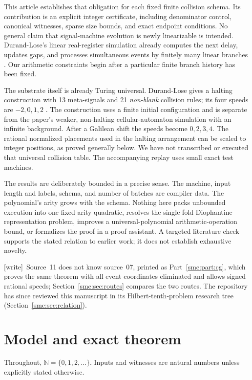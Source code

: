 \documentclass[11pt,letterpaper]{article}
\numberwithin{equation}{section}
\theoremstyle{definition}
\theoremstyle{remark}
\newcommand{\NN}{\mathbb N}
\newcommand{\wtag}{\textup{[write]}}
\begin{document}
This article establishes that obligation for each fixed finite collision schema. Its contribution is an explicit integer certificate, including denominator control, canonical witnesses, sparse size bounds, and exact endpoint conditions. No general claim that signal-machine evolution is newly linearizable is intended. Durand-Lose's linear real-register simulation already computes the next delay, updates gaps, and processes simultaneous events by finitely many linear branches \cite[Section~4]{DL07}. Our arithmetic constraints begin after a particular finite branch history has been fixed.

The substrate itself is already Turing universal. Durand-Lose gives a halting construction with 13 meta-signals and 21 \emph{non-blank} collision rules; its four speeds are $-2,0,1,2$ \cite[Theorem~5 and Figure~4]{durandlose}. The construction uses a finite initial configuration and is separate from the paper's weaker, non-halting cellular-automaton simulation with an infinite background. After a Galilean shift the speeds become $0,2,3,4$. The rational normalized placements used in the halting arrangement can be scaled to integer positions, as proved generally below. We have not transcribed or executed that universal collision table. The accompanying replay uses small exact test machines.

The results are deliberately bounded in a precise sense. The machine, input length and labels, schema, and number of batches are compiler data. The polynomial's arity grows with the schema. Nothing here packs unbounded execution into one fixed-arity quadratic, resolves the single-fold Diophantine representation problem, improves a universal-polynomial arithmetic-operation bound, or formalizes the proof in a proof assistant. A targeted literature check supports the stated relation to earlier work; it does not establish exhaustive novelty.


\wtag\ Source~11 does not know source~07, printed as Part~\ref{smc:part:cg}, which proves the same theorem with all event coordinates eliminated and allows signed rational speeds; Section~\ref{smc:sec:routes} compares the two routes. The repository has since reviewed this manuscript in its Hilbert-tenth-problem research tree (Section~\ref{smc:sec:relation}).

\section{Model and exact theorem}\label{smc:sd:sec:model}
Throughout, $\NN=\{0,1,2,\ldots\}$. Inputs and witnesses are natural numbers unless explicitly stated otherwise.
\end{document}
